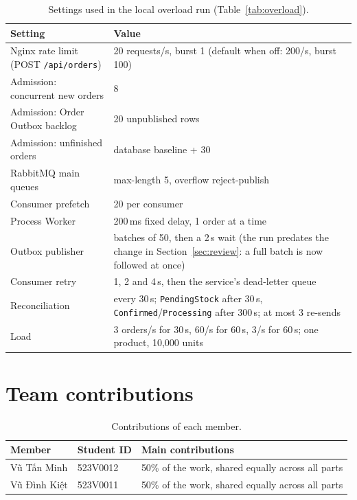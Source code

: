 \documentclass[12pt,a4paper]{article}
\begin{document}
\begin{table}[htbp]
\centering\small
\caption{Settings used in the local overload run (Table~\ref{tab:overload}).}
\label{tab:settings}
\begin{tabularx}{\textwidth}{lY}
\toprule
Setting & Value \\
\midrule
Nginx rate limit (POST \texttt{/api/orders}) & 20 requests/s, burst 1 (default when off: 200/s, burst 100) \\
Admission: concurrent new orders & 8 \\
Admission: Order Outbox backlog & 20 unpublished rows \\
Admission: unfinished orders & database baseline + 30 \\
RabbitMQ main queues & max-length 5, overflow reject-publish \\
Consumer prefetch & 20 per consumer \\
Process Worker & 200\,ms fixed delay, 1 order at a time \\
Outbox publisher & batches of 50, then a 2\,s wait (the run predates the change in Section~\ref{sec:review}: a full batch is now followed at once) \\
Consumer retry & 1, 2 and 4\,s, then the service's dead-letter queue \\
Reconciliation & every 30\,s; \texttt{PendingStock} after 30\,s, \texttt{Confirmed}/\texttt{Processing} after 300\,s; at most 3 re-sends \\
Load & 3 orders/s for 30\,s, 60/s for 60\,s, 3/s for 60\,s; one product, 10,000 units \\
\bottomrule
\end{tabularx}
\end{table}

\section{Team contributions}

\begin{table}[htbp]
\centering\small
\caption{Contributions of each member.}
\label{tab:team}
\begin{tabularx}{\textwidth}{llY}
\toprule
Member & Student ID & Main contributions \\
\midrule
Vũ Tấn Minh & 523V0012 & 50\% of the work, shared equally across all parts \\
Vũ Đình Kiệt & 523V0011 & 50\% of the work, shared equally across all parts \\
\bottomrule
\end{tabularx}
\end{table}
\end{document}
